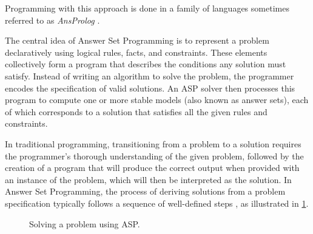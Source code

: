 \documentclass[10pt,leqno]{amsart}
\begin{document}
Programming with this approach is done in a family of languages 
sometimes referred to as \textit{AnsProlog} \cite{Gelfond2002}.

The central idea of Answer Set Programming is to represent a problem 
declaratively using logical rules, facts, and constraints. 
These elements collectively form a program that describes the conditions any solution must satisfy. 
Instead of writing an algorithm to solve the problem, 
the programmer encodes the specification of valid solutions. 
An ASP solver then processes this program to compute one or more stable models (also known as answer sets),
each of which corresponds to a solution that satisfies all the given rules and constraints.

In traditional programming, transitioning from a problem to a solution 
requires the programmer's thorough understanding of the given problem, 
followed by the creation of a program that will produce the correct output 
when provided with an instance of the problem, which will then be interpreted as the solution. 
In Answer Set Programming, the process of deriving solutions from a problem specification 
typically follows a sequence of well-defined steps \cite{Gebser2013}, 
as illustrated in \cref{fig:asp-solving}.

\begin{figure}[htb]
    \begin{center}
    \end{center}
		\caption{Solving a problem using ASP.}
    \label{fig:asp-solving}
\end{figure}
\end{document}
